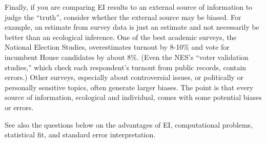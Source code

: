 \documentclass[11pt,titlepage]{article}
\begin{document}
Finally, if you are comparing EI results to an external source of
information to judge the ``truth'', consider whether the external
source may be biased.  For example, an estimate from survey data is
just an estimate and not necessarily be better than an ecological
inference.  One of the best academic surveys, the National Election
Studies, overestimates turnout by 8-10\% and vote for incumbent House
candidates by about 8\%.  (Even the NES's ``voter validation
studies,'' which check each respondent's turnout from public records,
contain errors.)  Other surveys, especially about controversial
issues, or politically or personally sensitive topics, often generate
larger biases.  The point is that every source of information,
ecological and individual, comes with some potential biases or errors.

See also the questions below on the advantages of EI, computational
problems, statistical fit, and standard error interpretation.
\end{document}
